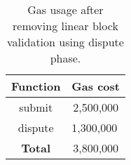 \begin{table}[]
\begin{tabular}{|c|c|}
\hline
\textbf{Function} & \textbf{Gas cost}              \\ \hline
\textsf{submit}            & 2,500,000                      \\ \hline
\textsf{dispute}           & \multicolumn{1}{l|}{1,300,000} \\ \hline
\textbf{Total}             & 3,800,000                      \\ \hline
\end{tabular}
\caption{Gas usage after removing linear block validation using dispute phase.}
\label{tab:dispute-cost}
\end{table}
